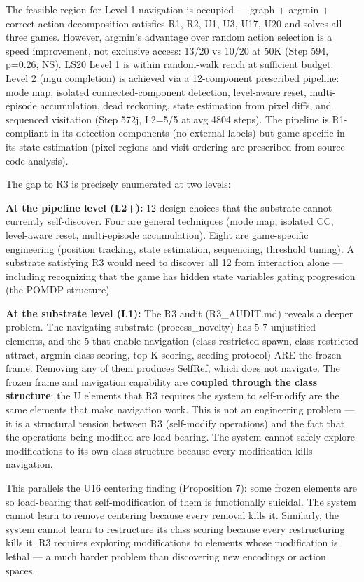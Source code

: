 \documentclass[
  11pt,
]{article}
\begin{document}
The feasible region for Level 1 navigation is occupied --- graph +
argmin + correct action decomposition satisfies R1, R2, U1, U3, U17, U20
and solves all three games. However, argmin's advantage over random
action selection is a speed improvement, not exclusive access: 13/20 vs
10/20 at 50K (Step 594, p=0.26, NS). LS20 Level 1 is within random-walk
reach at sufficient budget. Level 2 (mgu completion) is achieved via a
12-component prescribed pipeline: mode map, isolated connected-component
detection, level-aware reset, multi-episode accumulation, dead
reckoning, state estimation from pixel diffs, and sequenced visitation
(Step 572j, L2=5/5 at avg 4804 steps). The pipeline is R1-compliant in
its detection components (no external labels) but game-specific in its
state estimation (pixel regions and visit ordering are prescribed from
source code analysis).

The gap to R3 is precisely enumerated at two levels:

\textbf{At the pipeline level (L2+):} 12 design choices that the
substrate cannot currently self-discover. Four are general techniques
(mode map, isolated CC, level-aware reset, multi-episode accumulation).
Eight are game-specific engineering (position tracking, state
estimation, sequencing, threshold tuning). A substrate satisfying R3
would need to discover all 12 from interaction alone --- including
recognizing that the game has hidden state variables gating progression
(the POMDP structure).

\textbf{At the substrate level (L1):} The R3 audit (R3\_AUDIT.md)
reveals a deeper problem. The navigating substrate (process\_novelty)
has 5-7 unjustified elements, and the 5 that enable navigation
(class-restricted spawn, class-restricted attract, argmin class scoring,
top-K scoring, seeding protocol) ARE the frozen frame. Removing any of
them produces SelfRef, which does not navigate. The frozen frame and
navigation capability are \textbf{coupled through the class structure}:
the U elements that R3 requires the system to self-modify are the same
elements that make navigation work. This is not an engineering problem
--- it is a structural tension between R3 (self-modify operations) and
the fact that the operations being modified are load-bearing. The system
cannot safely explore modifications to its own class structure because
every modification kills navigation.

This parallels the U16 centering finding (Proposition 7): some frozen
elements are so load-bearing that self-modification of them is
functionally suicidal. The system cannot learn to remove centering
because every removal kills it. Similarly, the system cannot learn to
restructure its class scoring because every restructuring kills it. R3
requires exploring modifications to elements whose modification is
lethal --- a much harder problem than discovering new encodings or
action spaces.
\end{document}
